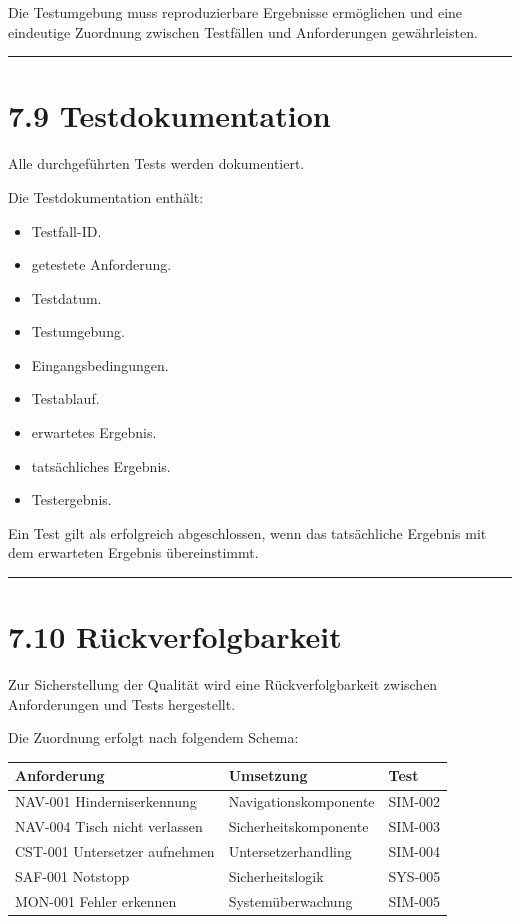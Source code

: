 \documentclass[
]{article}
\providecommand{\tightlist}{%
  \setlength{\itemsep}{0pt}\setlength{\parskip}{0pt}}
\begin{document}
Die Testumgebung muss reproduzierbare Ergebnisse ermöglichen und eine
eindeutige Zuordnung zwischen Testfällen und Anforderungen
gewährleisten.

\begin{center}\rule{0.5\linewidth}{0.5pt}\end{center}

\section{7.9 Testdokumentation}\label{testdokumentation}

Alle durchgeführten Tests werden dokumentiert.

Die Testdokumentation enthält:

\begin{itemize}
\tightlist
\item
  Testfall-ID.
\item
  getestete Anforderung.
\item
  Testdatum.
\item
  Testumgebung.
\item
  Eingangsbedingungen.
\item
  Testablauf.
\item
  erwartetes Ergebnis.
\item
  tatsächliches Ergebnis.
\item
  Testergebnis.
\end{itemize}

Ein Test gilt als erfolgreich abgeschlossen, wenn das tatsächliche
Ergebnis mit dem erwarteten Ergebnis übereinstimmt.

\begin{center}\rule{0.5\linewidth}{0.5pt}\end{center}

\section{7.10 Rückverfolgbarkeit}\label{ruxfcckverfolgbarkeit}

Zur Sicherstellung der Qualität wird eine Rückverfolgbarkeit zwischen
Anforderungen und Tests hergestellt.

Die Zuordnung erfolgt nach folgendem Schema:

\begin{longtable}[]{@{}lll@{}}
\toprule\noalign{}
Anforderung & Umsetzung & Test \\
\midrule\noalign{}
\endhead
\bottomrule\noalign{}
\endlastfoot
NAV-001 Hinderniserkennung & Navigationskomponente & SIM-002 \\
NAV-004 Tisch nicht verlassen & Sicherheitskomponente & SIM-003 \\
CST-001 Untersetzer aufnehmen & Untersetzerhandling & SIM-004 \\
SAF-001 Notstopp & Sicherheitslogik & SYS-005 \\
MON-001 Fehler erkennen & Systemüberwachung & SIM-005 \\
\end{longtable}
\end{document}
